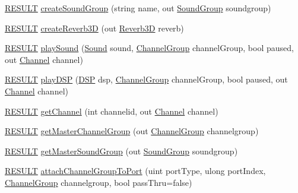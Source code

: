\begin{DoxyCompactItemize}
\item 
\hyperlink{namespace_f_m_o_d_a305d1176ef3f8c8815861a60407ac33d}{R\+E\+S\+U\+LT} \hyperlink{class_f_m_o_d_1_1_system_a6baf311b84ce5130639c287670b1ef41}{create\+Sound\+Group} (string name, out \hyperlink{class_f_m_o_d_1_1_sound_group}{Sound\+Group} soundgroup)
\item 
\hyperlink{namespace_f_m_o_d_a305d1176ef3f8c8815861a60407ac33d}{R\+E\+S\+U\+LT} \hyperlink{class_f_m_o_d_1_1_system_a732b5a43833f53e328ad64f2015d048a}{create\+Reverb3D} (out \hyperlink{class_f_m_o_d_1_1_reverb3_d}{Reverb3D} reverb)
\item 
\hyperlink{namespace_f_m_o_d_a305d1176ef3f8c8815861a60407ac33d}{R\+E\+S\+U\+LT} \hyperlink{class_f_m_o_d_1_1_system_a6900296cba46669a52211a58593bc52c}{play\+Sound} (\hyperlink{class_f_m_o_d_1_1_sound}{Sound} sound, \hyperlink{class_f_m_o_d_1_1_channel_group}{Channel\+Group} channel\+Group, bool paused, out \hyperlink{class_f_m_o_d_1_1_channel}{Channel} channel)
\item 
\hyperlink{namespace_f_m_o_d_a305d1176ef3f8c8815861a60407ac33d}{R\+E\+S\+U\+LT} \hyperlink{class_f_m_o_d_1_1_system_a2d6d9ea1fc61a43c52f56d8412bdbb16}{play\+D\+SP} (\hyperlink{class_f_m_o_d_1_1_d_s_p}{D\+SP} dsp, \hyperlink{class_f_m_o_d_1_1_channel_group}{Channel\+Group} channel\+Group, bool paused, out \hyperlink{class_f_m_o_d_1_1_channel}{Channel} channel)
\item 
\hyperlink{namespace_f_m_o_d_a305d1176ef3f8c8815861a60407ac33d}{R\+E\+S\+U\+LT} \hyperlink{class_f_m_o_d_1_1_system_aeab3abbecfb26b90e4c6d772fc59dd62}{get\+Channel} (int channelid, out \hyperlink{class_f_m_o_d_1_1_channel}{Channel} channel)
\item 
\hyperlink{namespace_f_m_o_d_a305d1176ef3f8c8815861a60407ac33d}{R\+E\+S\+U\+LT} \hyperlink{class_f_m_o_d_1_1_system_aa03f6c1ce05970455094eb25af983443}{get\+Master\+Channel\+Group} (out \hyperlink{class_f_m_o_d_1_1_channel_group}{Channel\+Group} channelgroup)
\item 
\hyperlink{namespace_f_m_o_d_a305d1176ef3f8c8815861a60407ac33d}{R\+E\+S\+U\+LT} \hyperlink{class_f_m_o_d_1_1_system_af789867ecd0d9c452b70648bf46f15ee}{get\+Master\+Sound\+Group} (out \hyperlink{class_f_m_o_d_1_1_sound_group}{Sound\+Group} soundgroup)
\item 
\hyperlink{namespace_f_m_o_d_a305d1176ef3f8c8815861a60407ac33d}{R\+E\+S\+U\+LT} \hyperlink{class_f_m_o_d_1_1_system_aa0d216725f4487725433d4dc72595936}{attach\+Channel\+Group\+To\+Port} (uint port\+Type, ulong port\+Index, \hyperlink{class_f_m_o_d_1_1_channel_group}{Channel\+Group} channelgroup, bool pass\+Thru=false)

\end{DoxyCompactItemize}
